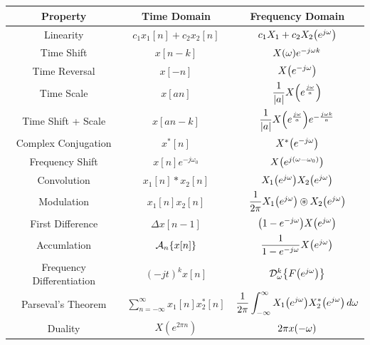 \documentclass[11pt]{article}
\begin{document}
  \bgroup
  \renewcommand{\arraystretch}{2.1}
  \setlength{\tabcolsep}{0.8cm}
  \large\begin{tabular}{c|c|c}
    Property & Time Domain & Frequency Domain \\
    \toprule
    Linearity & \(c_1x_1[n] + c_2x_2[n]\) & \(c_1X_1 + c_2X_2{\left( e^{j\omega} \right)}\) \\
    Time Shift & \(x[n - k]\) & \(X{\left( \omega \right)}e^{-j\omega k}\)\\
    Time Reversal & \(x[-n]\) & \(X{\left( e^{-j\omega} \right)}\)\\
    Time Scale & \(x[an]\) & \(\dfrac{1}{|a|}X{\left( e^{\frac{j\omega}{a}} \right)}\)\\
    Time Shift + Scale & \(x[an - k]\) & \(\dfrac{1}{|a|}X{\left( e^{\frac{j\omega}{a}} \right)}e^{-\frac{j\omega k}{a}}\)\\
    Complex Conjugation & \(x^*[n]\) & \(X^*{\left( e^{-j\omega} \right)}\)\\
    Frequency Shift & \(x[n]e^{-j\omega_0}\) & \(X{\left( e^{j(\omega - \omega_0)} \right)}\)\\
    Convolution & \(x_1[n] * x_2[n]\) & \(X_1{\left( e^{j\omega} \right)}X_2{\left( e^{j\omega} \right)}\) \\
    Modulation & \(x_1[n]x_2[n]\) & \(\dfrac{1}{2\pi} X_1\prn{e^{j\omega}} \oast X_2\prn{e^{j\omega}}\) \\
    First Difference & \(\Delta x[n - 1]\) & \({\left( 1 - e^{-j\omega} \right)}X{\left( e^{j\omega} \right)}\) \\
    Accumlation & \(\mathcal{A}_n\{x[n]\}\) & \(\dfrac{1}{1 - e^{-j\omega}}X{\left( e^{j\omega} \right)}\) \\
    Frequency Differentiation & \((-jt)^k x[n]\) & \(\mathcal{D}_{\omega}^k{\left\{ F{\left( e^{j\omega} \right)} \right\}}\) \\
    Parseval's Theorem & \(\displaystyle\sum_{n = -\infty}^{\infty} x_1[n]x_2^*[n] \) &
    \(\dfrac{1}{2\pi}\displaystyle\int_{-\infty}^{\infty} X_1{\left( e^{j\omega} \right)}X_2^*{\left( e^{j\omega} \right)} \,d\omega\) \\
    Duality & \(X(e^{2\pi n})\) & \(2\pi x{\left( -\omega \right)}\)
  \end{tabular}
  \egroup

  \pagebreak
\end{document}
